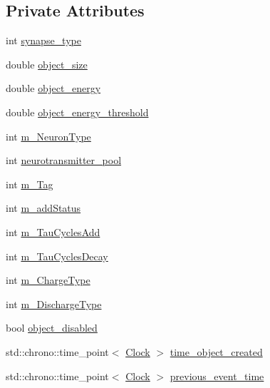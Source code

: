 \subsection*{Private Attributes}
\begin{DoxyCompactItemize}
\item 
int \mbox{\hyperlink{classSynapse_a612d4b6465dc34887fb44c35a8178ee4}{synapse\+\_\+type}}
\item 
double \mbox{\hyperlink{classSynapse_a77b50411221e399c2ddc6def2fdd9a46}{object\+\_\+size}}
\item 
double \mbox{\hyperlink{classSynapse_aa96848ccedd9362a654b451a78326592}{object\+\_\+energy}}
\item 
double \mbox{\hyperlink{classSynapse_aa4393430b47ea5e157ddf0fb0b4c8a2e}{object\+\_\+energy\+\_\+threshold}}
\item 
int \mbox{\hyperlink{classSynapse_a7983e1d9e07a5f677cbde5510d3d6521}{m\+\_\+\+Neuron\+Type}}
\item 
int \mbox{\hyperlink{classSynapse_a0ece24fe6dedbfed206a7540b7347658}{neurotransmitter\+\_\+pool}}
\item 
int \mbox{\hyperlink{classSynapse_a0687ebfa82329b596fbd2f9f7400aa39}{m\+\_\+\+Tag}}
\item 
int \mbox{\hyperlink{classSynapse_a7f630b1d28c221502e14daab758c6dd7}{m\+\_\+add\+Status}}
\item 
int \mbox{\hyperlink{classSynapse_a7dbdce94e017f494677e1991e5beeb93}{m\+\_\+\+Tau\+Cycles\+Add}}
\item 
int \mbox{\hyperlink{classSynapse_a1aa2ead64f40b729bedce5b09ca69c6e}{m\+\_\+\+Tau\+Cycles\+Decay}}
\item 
int \mbox{\hyperlink{classSynapse_a37e3edaee7ba77a45a3777c253d5d073}{m\+\_\+\+Charge\+Type}}
\item 
int \mbox{\hyperlink{classSynapse_acd54d9a5401e5b4eb52c8eb8e16e0c9e}{m\+\_\+\+Discharge\+Type}}
\item 
bool \mbox{\hyperlink{classSynapse_a3fc1cf2626bdacf717b239161c42bb1e}{object\+\_\+disabled}}
\item 
std\+::chrono\+::time\+\_\+point$<$ \mbox{\hyperlink{universe_8h_a0ef8d951d1ca5ab3cfaf7ab4c7a6fd80}{Clock}} $>$ \mbox{\hyperlink{classSynapse_afbfdba5e6a7bfaf688189d07a9dd62a0}{time\+\_\+object\+\_\+created}}
\item 
std\+::chrono\+::time\+\_\+point$<$ \mbox{\hyperlink{universe_8h_a0ef8d951d1ca5ab3cfaf7ab4c7a6fd80}{Clock}} $>$ \mbox{\hyperlink{classSynapse_a75f080d987ac346b2410125a56eed650}{previous\+\_\+event\+\_\+time}}

\end{DoxyCompactItemize}
